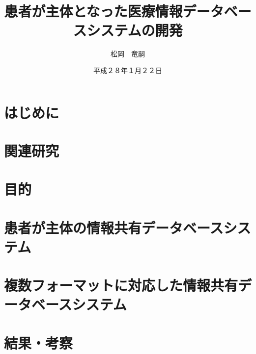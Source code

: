 \documentclass[12pt]{sotsuron}
\title{患者が主体となった医療情報データベースシステムの開発}
\author{松岡　竜嗣}
\date{平成２８年１月２２日}
\affiliation{電子機械工学専攻}
\begin{document}
\maketitle

\begin{abstract}

%
\end{abstract}

\tableofcontents
\clearpage



\section{はじめに}

\clearpage

\section{関連研究}

\clearpage

\section{目的}

\clearpage

\section{患者が主体の情報共有データベースシステム}

\clearpage

\section{複数フォーマットに対応した情報共有データベースシステム}

\clearpage



\section{結果・考察}

\clearpage


\appendix

\end{document}
